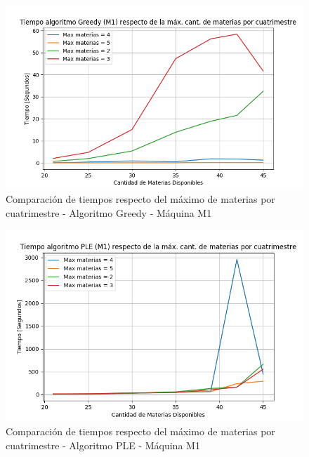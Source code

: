 \documentclass[a4paper]{article}
\begin{document}
\begin{figure}[H]
\centering
\includegraphics[scale=0.65]{Imagenes/m1_GREEDY_max_cantidad_materias_cuatrimestres.png}\par
\caption{Comparación de tiempos respecto del máximo de materias por cuatrimestre - Algoritmo Greedy - Máquina M1}
\end{figure}

\begin{figure}[H]
\centering
\includegraphics[scale=0.65]{Imagenes/m1_PLE_max_cantidad_materias_cuatrimestres.png}\par
\caption{Comparación de tiempos respecto del máximo de materias por cuatrimestre - Algoritmo PLE - Máquina M1}
\end{figure}
\end{document}
